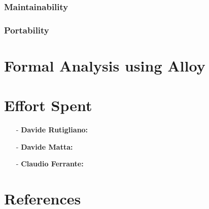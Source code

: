 \documentclass[a4paper]{article}
\begin{document}
        \subsubsection{Maintainability}
        
        \subsubsection{Portability}
        
\newpage
\section{Formal Analysis using Alloy}

\newpage
\section{Effort Spent}
    \begin{itemize}
        \item[-] \textbf{Davide Rutigliano:}
        
        \item[-] \textbf{Davide Matta:}
        
        \item[-] \textbf{Claudio Ferrante:}
    \end{itemize}

\section{References}
\end{document}
